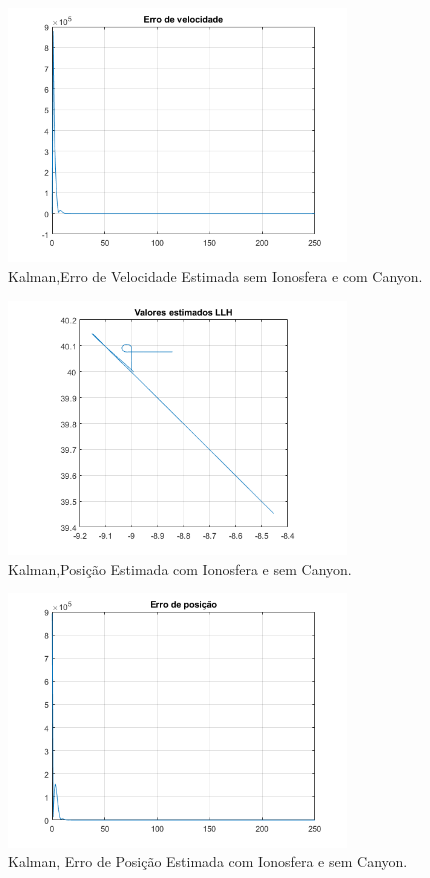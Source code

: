 \documentclass[palatino]{ist-report}
\begin{document}
\begin{figure}[ht]
	\centering
	\includegraphics[width=0.8\textwidth]{kalman_2/2-2-erro_velocidade.png}
	\caption{Kalman,Erro de Velocidade Estimada sem Ionosfera e com Canyon.}
	\label{evelocidade22}
\end{figure}

\begin{figure}[ht]
	\centering
	\includegraphics[width=0.8\textwidth]{kalman_3/2-3-plot_posicao_estimada_LLH.png}
	\caption{Kalman,Posição Estimada com Ionosfera e sem Canyon.}
	\label{Posicao23}
\end{figure}

\begin{figure}[ht]
	\centering
	\includegraphics[width=0.8\textwidth]{kalman_3/2-3-erro_posicao.png}
	\caption{Kalman, Erro de Posição Estimada com Ionosfera e sem Canyon.}
	\label{ePosicao23}
\end{figure}
\end{document}
